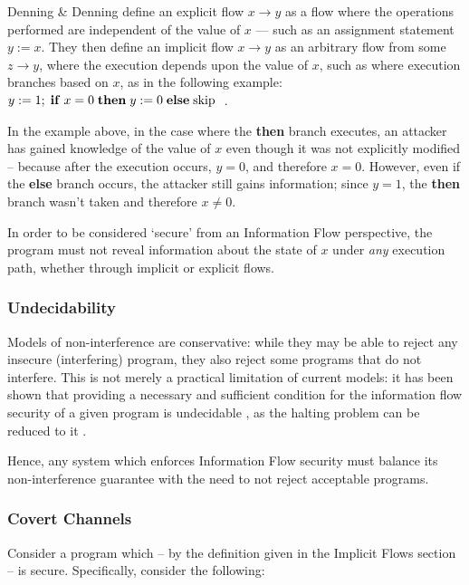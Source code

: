 Denning \& Denning \cite{denning1977if} define an explicit flow $ x \rightarrow y$ as a flow where the operations performed are independent of the value of $ x $ --- such as an assignment statement $ y := x $. They then define an implicit flow $ x \rightarrow y$ as an arbitrary flow from some $ z \rightarrow y $, where the execution depends upon the value of $ x $, such as where execution branches based on $ x $, as in the following example: $ y := 1; \;\text{\textbf{if}}\; x = 0 \;\text{\textbf{then}}\; y := 0 \;\text{\textbf{else}}\; \text{skip}\;$ \cite{denning1977if}.

In the example above, in the case where the \textbf{then} branch executes, an attacker has gained knowledge of the value of $ x $ even though it was not explicitly modified -- because after the execution occurs, $ y = 0 $, and therefore $ x = 0 $. However, even if the \textbf{else} branch occurs, the attacker still gains information; since $ y = 1 $, the \textbf{then} branch wasn't taken and therefore $ x \ne 0 $.

In order to be considered `secure' from an Information Flow perspective, the program must not reveal information about the state of $ x $ under \textit{any} execution path, whether through implicit or explicit flows.

\subsubsection{Undecidability}

Models of non-interference are conservative: while they may be able to reject any insecure (interfering) program, they also reject some programs that do not interfere. This is not merely a practical limitation of current models: it has been shown that providing a necessary and sufficient condition for the information flow security of a given program is undecidable \cite{landi1992undecidability}, as the halting problem can be reduced to it \cite{denning1977if}.

Hence, any system which enforces Information Flow security must balance its non-interference guarantee with the need to not reject acceptable programs.

\subsubsection{Covert Channels}

Consider a program which -- by the definition given in the Implicit Flows section -- is secure. Specifically, consider the following: 

